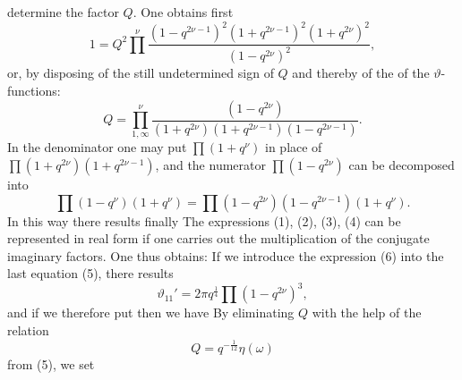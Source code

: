 determine the factor $Q$. One obtains first
\[
1 = Q^2\prod^{\nu}\frac{(1-q^{2\nu-1})^2(1+q^{2\nu-1})^2(1+q^{2\nu})^2}{(1-q^{2\nu})^2},
\]
or, by disposing of the still undetermined sign of $Q$ and thereby of the  of the
$\vartheta$-functions:
\[
Q = \prod_{1,\infty}^{\nu}\frac{(1-q^{2\nu})}{(1+q^{2\nu})(1+q^{2\nu-1})(1-q^{2\nu-1})}.
\]
In the denominator one may put $\prod(1+q^{\nu})$ in place of $\prod(1+q^{2\nu})(1+q^{2\nu-1})$,
and the numerator $\prod(1-q^{2\nu})$ can be decomposed into
\[
\prod(1-q^{\nu})(1+q^{\nu}) = \prod(1-q^{2\nu})(1-q^{2\nu-1})(1+q^{\nu}).
\]
In this way there results finally
The expressions (1), (2), (3), (4) can be represented in real form if one carries out the
multiplication of the conjugate imaginary factors. One thus obtains:
If we introduce the expression (6) into the last equation (5), there results
\[
\vartheta_{11}' = 2\pi q^{\frac{1}{4}}\prod(1 - q^{2\nu})^3,
\]
and if we therefore put
then we have
By eliminating $Q$ with the help of the relation
\[
Q = q^{-\frac{1}{12}}\eta(\omega)
\]
from (5), we set
